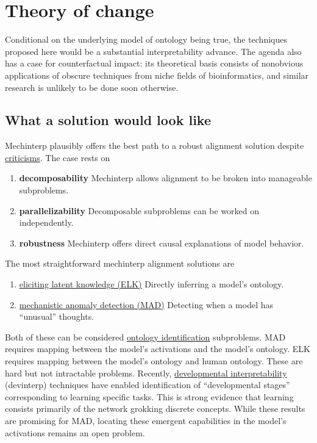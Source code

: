 \section{Theory of change}
Conditional on the underlying model of ontology being true, the
techniques proposed here would be a substantial interpretability
advance. The agenda also has a case for counterfactual impact: its
theoretical basis consists of nonobvious applications of obscure
techniques from niche fields of bioinformatics, and similar research
is unlikely to be done soon otherwise.

\subsection{What a solution would look like}
Mechinterp plausibly offers the best path to a robust alignment
solution despite
\href{https://www.lesswrong.com/posts/tEPHGZAb63dfq2v8n/how-useful-is-mechanistic-interpretability}{criticisms}.
The case rests on
\begin{enumerate}
    \item \textbf{decomposability} Mechinterp allows alignment to be
    broken into manageable subproblems.
    \item \textbf{parallelizability} Decomposable subproblems can be
    worked on independently.
    \item \textbf{robustness} Mechinterp offers direct causal
    explanations of model behavior.
\end{enumerate}
The most straightforward mechinterp alignment solutions are
\begin{enumerate}
    \item \href{https://www.alignment.org/blog/arcs-first-technical-report-eliciting-latent-knowledge/}{eliciting latent knowledge (ELK)}
    Directly inferring a model's ontology.
    \label{it:elk}
    \item \href{https://www.alignment.org/blog/mechanistic-anomaly-detection-and-elk/}{mechanistic anomaly detection (MAD)}
    Detecting when a model has ``unusual'' thoughts.
    \label{it:mad}
\end{enumerate}
Both of these can be considered
\href{https://arbital.greaterwrong.com/p/ontology_identification/}{ontology identification}
subproblems. MAD requires mapping between the model's activations and
the model's ontology. ELK requires mapping between the model's ontology
and human ontology. These are hard but not intractable problems.
Recently, \href{https://devinterp.com/}{developmental interpretability}
(devinterp) techniques have enabled identification of ``developmental
stages'' corresponding to learning specific
tasks\cite{hoogland2024developmental}. This is strong evidence that
learning consists primarily of the network
grokking\cite{nanda2023progress} discrete concepts. While these results
are promising for MAD, locating these emergent capabilities in the
model's activations remains an open problem.

